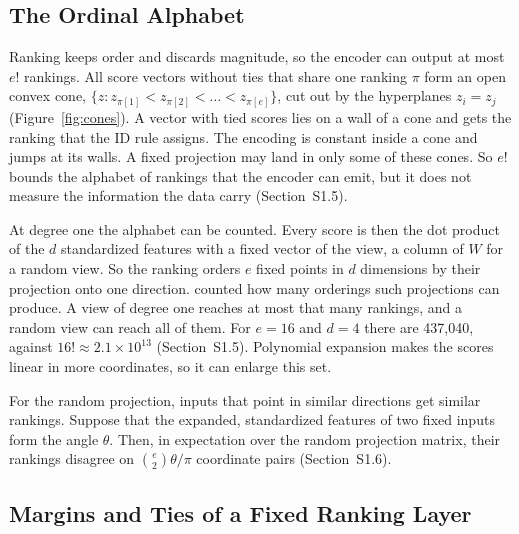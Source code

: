 \subsection{The Ordinal Alphabet}\label{sec:theory-alphabet}

Ranking keeps order and discards magnitude, so the encoder can output at most $e!$ rankings. All score vectors without ties that share one ranking $\pi$ form an open convex cone, $\{z: z_{\pi[1]}<z_{\pi[2]}<\dots<z_{\pi[e]}\}$, cut out by the hyperplanes $z_i=z_j$ (Figure~\ref{fig:cones}). A vector with tied scores lies on a wall of a cone and gets the ranking that the ID rule assigns. The encoding is constant inside a cone and jumps at its walls. A fixed projection may land in only some of these cones. So $e!$ bounds the alphabet of rankings that the encoder can emit, but it does not measure the information the data carry (Section~S1.5).

At degree one the alphabet can be counted. Every score is then the dot product of the $d$ standardized features with a fixed vector of the view, a column of $W$ for a random view. So the ranking orders $e$ fixed points in $d$ dimensions by their projection onto one direction. \citet{cover1967orderings} counted how many orderings such projections can produce. A view of degree one reaches at most that many rankings, and a random view can reach all of them. For $e=16$ and $d=4$ there are 437,040, against $16!\approx2.1\times10^{13}$ (Section~S1.5). Polynomial expansion makes the scores linear in more coordinates, so it can enlarge this set.

For the random projection, inputs that point in similar directions get similar rankings. Suppose that the expanded, standardized features of two fixed inputs form the angle $\theta$. Then, in expectation over the random projection matrix, their rankings disagree on $\binom{e}{2}\theta/\pi$ coordinate pairs (Section~S1.6).



\subsection{Margins and Ties of a Fixed Ranking Layer}\label{sec:theory-margin}

